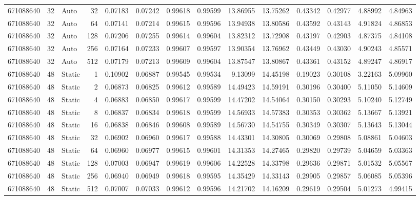 \begin{tabular}{rrlrrrrrrrrrrr}
671088640 & 32 & Auto & 32 & 0.07183 & 0.07242 & 0.99618 & 0.99599 & 13.86955 & 13.75262 & 0.43342 & 0.42977 & 4.88992 & 4.84963 \\
671088640 & 32 & Auto & 64 & 0.07141 & 0.07214 & 0.99615 & 0.99596 & 13.94938 & 13.80586 & 0.43592 & 0.43143 & 4.91824 & 4.86853 \\
671088640 & 32 & Auto & 128 & 0.07206 & 0.07255 & 0.99614 & 0.99604 & 13.82312 & 13.72908 & 0.43197 & 0.42903 & 4.87375 & 4.84108 \\
671088640 & 32 & Auto & 256 & 0.07164 & 0.07233 & 0.99607 & 0.99597 & 13.90354 & 13.76962 & 0.43449 & 0.43030 & 4.90243 & 4.85571 \\
671088640 & 32 & Auto & 512 & 0.07179 & 0.07213 & 0.99609 & 0.99604 & 13.87547 & 13.80867 & 0.43361 & 0.43152 & 4.89247 & 4.86917 \\
671088640 & 48 & Static & 1 & 0.10902 & 0.06887 & 0.99545 & 0.99534 & 9.13099 & 14.45198 & 0.19023 & 0.30108 & 3.22163 & 5.09960 \\
671088640 & 48 & Static & 2 & 0.06873 & 0.06825 & 0.99612 & 0.99589 & 14.49423 & 14.59191 & 0.30196 & 0.30400 & 5.11050 & 5.14609 \\
671088640 & 48 & Static & 4 & 0.06883 & 0.06850 & 0.99617 & 0.99599 & 14.47202 & 14.54064 & 0.30150 & 0.30293 & 5.10240 & 5.12749 \\
671088640 & 48 & Static & 8 & 0.06837 & 0.06834 & 0.99618 & 0.99599 & 14.56933 & 14.57383 & 0.30353 & 0.30362 & 5.13667 & 5.13921 \\
671088640 & 48 & Static & 16 & 0.06838 & 0.06846 & 0.99608 & 0.99589 & 14.56730 & 14.54755 & 0.30349 & 0.30307 & 5.13643 & 5.13044 \\
671088640 & 48 & Static & 32 & 0.06902 & 0.06960 & 0.99617 & 0.99588 & 14.43301 & 14.30805 & 0.30069 & 0.29808 & 5.08861 & 5.04603 \\
671088640 & 48 & Static & 64 & 0.06960 & 0.06977 & 0.99615 & 0.99601 & 14.31353 & 14.27465 & 0.29820 & 0.29739 & 5.04659 & 5.03363 \\
671088640 & 48 & Static & 128 & 0.07003 & 0.06947 & 0.99619 & 0.99606 & 14.22528 & 14.33798 & 0.29636 & 0.29871 & 5.01532 & 5.05567 \\
671088640 & 48 & Static & 256 & 0.06940 & 0.06949 & 0.99618 & 0.99595 & 14.35429 & 14.33143 & 0.29905 & 0.29857 & 5.06085 & 5.05396 \\
671088640 & 48 & Static & 512 & 0.07007 & 0.07033 & 0.99612 & 0.99596 & 14.21702 & 14.16209 & 0.29619 & 0.29504 & 5.01273 & 4.99415 \\

\end{tabular}
